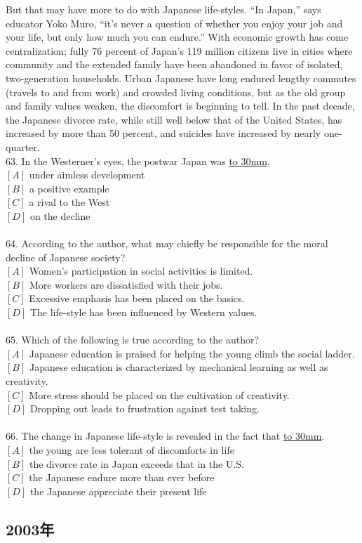 \documentclass[a4paper]{article}
\begin{document}
\par
But that may have more to do with Japanese life-styles. “In Japan,” says educator Yoko Muro, “it’s never a question of whether you enjoy your job and your life, but only how much you can endure.” With economic growth has come centralization; fully 76 percent of Japan’s 119 million citizens live in cities where community and the extended family have been abandoned in favor of isolated, two-generation households. Urban Japanese have long endured lengthy commutes (travels to and from work) and crowded living conditions, but as the old group and family values weaken, the discomfort is beginning to tell. In the past decade, the Japanese divorce rate, while still well below that of the United States, has increased by more than 50 percent, and suicides have increased by nearly one-quarter.
\\63.	In the Westerner’s eyes, the postwar Japan was \underline{\hbox to 30mm{}}.\\$[A]$ under aimless development\\$[B]$ a positive example\\$[C]$ a rival to the West\\$[D]$ on the decline\\\\64.	According to the author, what may chiefly be responsible for the moral decline of Japanese society?\\$[A]$ Women’s participation in social activities is limited.\\$[B]$ More workers are dissatisfied with their jobs.\\$[C]$ Excessive emphasis has been placed on the basics.\\$[D]$ The life-style has been influenced by Western values.\\\\65.	Which of the following is true according to the author?\\$[A]$ Japanese education is praised for helping the young climb the social ladder.\\$[B]$ Japanese education is characterized by mechanical learning as well as creativity.\\$[C]$ More stress should be placed on the cultivation of creativity.\\$[D]$ Dropping out leads to frustration against test taking.\\\\66.	The change in Japanese life-style is revealed in the fact that \underline{\hbox to 30mm{}}.\\$[A]$ the young are less tolerant of discomforts in life\\$[B]$ the divorce rate in Japan exceeds that in the U.S.\\$[C]$ the Japanese endure more than ever before\\$[D]$ the Japanese appreciate their present life\\\subsection{2003年}
\end{document}
